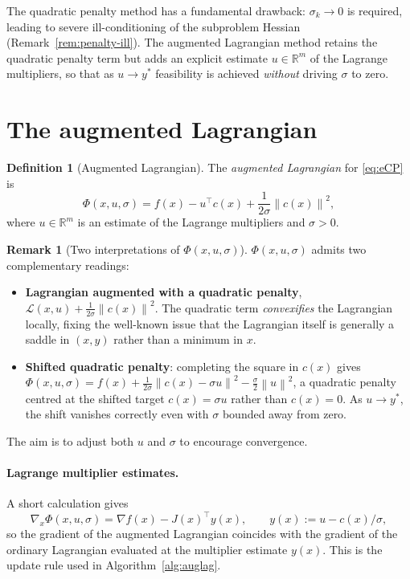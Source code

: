\documentclass[11pt,a4paper]{report}
\theoremstyle{plain}
\theoremstyle{definition}
\newtheorem{definition}[theorem]{Definition}
\newtheorem{remark}[theorem]{Remark}
\newcommand{\R}{\mathbb{R}}
\newcommand{\norm}[1]{\left\lVert#1\right\rVert}
\newcommand{\grad}{\nabla}
\newcommand{\trans}{^{\top}}
\begin{document}
The quadratic penalty method has a fundamental drawback: $\sigma_{k}\to 0$ is
required, leading to severe ill-conditioning of the subproblem Hessian
(Remark~\ref{rem:penalty-ill}). The augmented Lagrangian method retains the
quadratic penalty term but adds an explicit estimate $u\in\R^{m}$ of the
Lagrange multipliers, so that as $u\to y^{*}$ feasibility is achieved
\emph{without} driving $\sigma$ to zero.

\section{The augmented Lagrangian}

\begin{definition}[Augmented Lagrangian]
The \emph{augmented Lagrangian} for \eqref{eq:eCP} is
\begin{equation}\label{eq:auglag}
\Phi(x,u,\sigma)=f(x)-u\trans c(x)+\frac{1}{2\sigma}\norm{c(x)}^{2},
\end{equation}
where $u\in\R^{m}$ is an estimate of the Lagrange multipliers and $\sigma>0$.
\end{definition}

\begin{remark}[Two interpretations of $\Phi(x,u,\sigma)$]
$\Phi(x,u,\sigma)$ admits two complementary readings:
\begin{itemize}[leftmargin=2em,itemsep=0pt]
  \item \textbf{Lagrangian augmented with a quadratic penalty}, $\mathcal{L}(x,u)+\frac{1}{2\sigma}\norm{c(x)}^{2}$.
        The quadratic term \emph{convexifies} the Lagrangian locally, fixing the
        well-known issue that the Lagrangian itself is generally a saddle in
        $(x,y)$ rather than a minimum in $x$.
  \item \textbf{Shifted quadratic penalty}: completing the square in $c(x)$ gives
        $\Phi(x,u,\sigma)=f(x)+\frac{1}{2\sigma}\norm{c(x)-\sigma u}^{2}-\tfrac{\sigma}{2}\norm{u}^{2}$,
        a quadratic penalty centred at the shifted target $c(x)=\sigma u$ rather
        than $c(x)=0$. As $u\to y^{*}$, the shift vanishes correctly even with
        $\sigma$ bounded away from zero.
\end{itemize}
The aim is to adjust both $u$ and $\sigma$ to encourage convergence.
\end{remark}

\paragraph{Lagrange multiplier estimates.} A short calculation gives
\[
\grad_{x}\Phi(x,u,\sigma)=\grad f(x)-J(x)\trans y(x), \qquad
y(x):=u-c(x)/\sigma,
\]
so the gradient of the augmented Lagrangian coincides with the gradient of the
ordinary Lagrangian evaluated at the multiplier estimate $y(x)$. This is the
update rule used in Algorithm~\ref{alg:auglag}.
\end{document}
